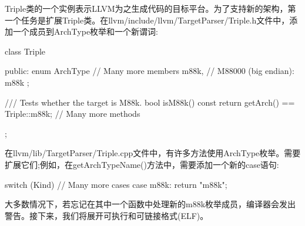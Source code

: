 Triple类的一个实例表示LLVM为之生成代码的目标平台。为了支持新的架构，第一个任务是扩展Triple类。在llvm/include/llvm/TargetParser/Triple.h文件中，添加一个成员到ArchType枚举和一个新谓词:

\begin{cpp}
class Triple {
public:
    enum ArchType {
        // Many more members
        m88k, // M88000 (big endian): m88k
    };

    /// Tests whether the target is M88k.
    bool isM88k() const {
        return getArch() == Triple::m88k;
    }
    // Many more methods
};
\end{cpp}

在llvm/lib/TargetParser/Triple.cpp文件中，有许多方法使用ArchType枚举。需要扩展它们;例如，在getArchTypeName()方法中，需要添加一个新的case语句:

\begin{cpp}
switch (Kind) {
    // Many more cases
    case m88k: return "m88k";
}
\end{cpp}

大多数情况下，若忘记在其中一个函数中处理新的m88k枚举成员，编译器会发出警告。接下来，我们将展开可执行和可链接格式(ELF)。

































